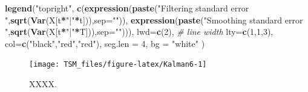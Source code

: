 \documentclass[
  12pt,
]{book}
\newenvironment{Shaded}{\begin{snugshade}}{\end{snugshade}}
\newcommand{\AttributeTok}[1]{\textcolor[rgb]{0.13,0.29,0.53}{#1}}
\newcommand{\CommentTok}[1]{\textcolor[rgb]{0.56,0.35,0.01}{\textit{#1}}}
\newcommand{\DecValTok}[1]{\textcolor[rgb]{0.00,0.00,0.81}{#1}}
\newcommand{\FunctionTok}[1]{\textcolor[rgb]{0.13,0.29,0.53}{\textbf{#1}}}
\newcommand{\NormalTok}[1]{#1}
\newcommand{\SpecialCharTok}[1]{\textcolor[rgb]{0.81,0.36,0.00}{\textbf{#1}}}
\newcommand{\StringTok}[1]{\textcolor[rgb]{0.31,0.60,0.02}{#1}}
\theoremstyle{definition}
\theoremstyle{definition}
\theoremstyle{definition}
\theoremstyle{definition}
\theoremstyle{remark}
\begin{document}
\begin{Shaded}
\begin{Highlighting}[]
\FunctionTok{legend}\NormalTok{(}\StringTok{"topright"}\NormalTok{, }
       \FunctionTok{c}\NormalTok{(}\FunctionTok{expression}\NormalTok{(}\FunctionTok{paste}\NormalTok{(}\StringTok{"Filtering standard error "}\NormalTok{,}\FunctionTok{sqrt}\NormalTok{(}\FunctionTok{Var}\NormalTok{(X[t}\SpecialCharTok{*}\StringTok{"|"}\SpecialCharTok{*}\NormalTok{t])),}\AttributeTok{sep=}\StringTok{""}\NormalTok{)),}
         \FunctionTok{expression}\NormalTok{(}\FunctionTok{paste}\NormalTok{(}\StringTok{"Smoothing standard error "}\NormalTok{,}\FunctionTok{sqrt}\NormalTok{(}\FunctionTok{Var}\NormalTok{(X[t}\SpecialCharTok{*}\StringTok{"|"}\SpecialCharTok{*}\NormalTok{T])),}\AttributeTok{sep=}\StringTok{""}\NormalTok{))),}
       \AttributeTok{lwd=}\FunctionTok{c}\NormalTok{(}\DecValTok{2}\NormalTok{), }\CommentTok{\# line width}
       \AttributeTok{lty=}\FunctionTok{c}\NormalTok{(}\DecValTok{1}\NormalTok{,}\DecValTok{1}\NormalTok{,}\DecValTok{3}\NormalTok{),}
       \AttributeTok{col=}\FunctionTok{c}\NormalTok{(}\StringTok{"black"}\NormalTok{,}\StringTok{"red"}\NormalTok{,}\StringTok{"red"}\NormalTok{),}
       \AttributeTok{seg.len =} \DecValTok{4}\NormalTok{,}
       \AttributeTok{bg =} \StringTok{"white"}
\NormalTok{)}
\end{Highlighting}
\end{Shaded}

\begin{figure}
\texttt{[image: TSM\_files/figure-latex/Kalman6-1]} \caption{XXXX.}\label{fig:Kalman6}
\end{figure}
\end{document}
